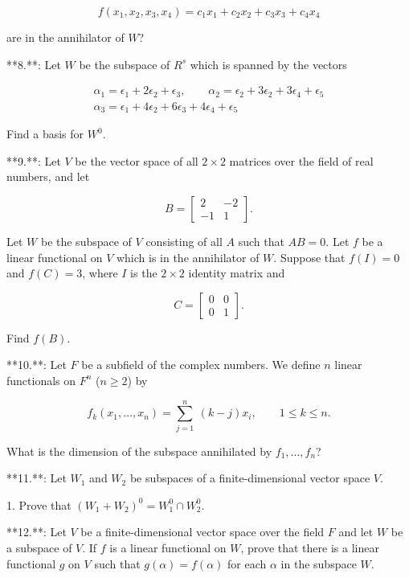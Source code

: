 \[f(x_{1},x_{2},x_{3},x_{4})=c_{1}x_{1}+c_{2}x_{2}+c_{3}x_{3}+c_{4}x_{4}\]

are in the annihilator of \(W\)?

**8.**: Let \(W\) be the subspace of \(R^{s}\) which is spanned by the vectors

\[\begin{array}{l}\alpha_{1}=\epsilon_{1}+2\epsilon_{2}+\epsilon_{3},\qquad \alpha_{2}=\epsilon_{2}+3\epsilon_{2}+3\epsilon_{4}+\epsilon_{5}\\ \alpha_{3}=\epsilon_{1}+4\epsilon_{2}+6\epsilon_{3}+4\epsilon_{4}+\epsilon_{5} \end{array}\]

Find a basis for \(W^{0}\).

**9.**: Let \(V\) be the vector space of all \(2\times 2\) matrices over the field of real numbers, and let

\[B=\begin{bmatrix}2&-2\\ -1&1\end{bmatrix}.\]

Let \(W\) be the subspace of \(V\) consisting of all \(A\) such that \(AB=0\). Let \(f\) be a linear functional on \(V\) which is in the annihilator of \(W\). Suppose that \(f(I)=0\) and \(f(C)=3\), where \(I\) is the \(2\times 2\) identity matrix and

\[C=\begin{bmatrix}0&0\\ 0&1\end{bmatrix}.\]

Find \(f(B)\).

**10.**: Let \(F\) be a subfield of the complex numbers. We define \(n\) linear functionals on \(F^{n}\) (\(n\geq 2\)) by

\[f_{k}(x_{1},\ldots,x_{n})=\sum\limits_{j=1}^{n}\ (k-j)x_{i},\qquad 1\leq k \leq n.\]

What is the dimension of the subspace annihilated by \(f_{1},\ldots,f_{n}\)?

**11.**: Let \(W_{1}\) and \(W_{2}\) be subspaces of a finite-dimensional vector space \(V\).

1. Prove that \((W_{1}+W_{2})^{0}=W_{1}^{0}\cap W_{2}^{0}\).

**12.**: Let \(V\) be a finite-dimensional vector space over the field \(F\) and let \(W\) be a subspace of \(V\). If \(f\) is a linear functional on \(W\), prove that there is a linear functional \(g\) on \(V\) such that \(g(\alpha)=f(\alpha)\) for each \(\alpha\) in the subspace \(W\).

